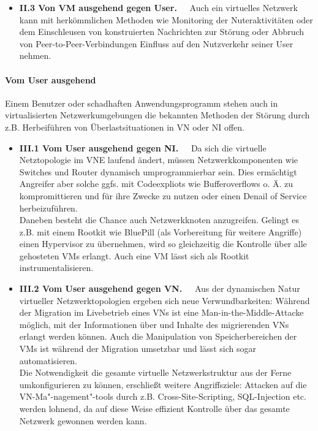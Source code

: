 \begin{itemize}
\item \textbf{II.3 Von VM ausgehend gegen User.~~}
Auch ein virtuelles Netzwerk kann mit herkömmlichen Methoden wie Monitoring der Nuteraktivitäten oder dem Einschleusen von konstruierten Nachrichten zur Störung oder Abbruch von Peer-to-Peer-Verbindungen Einfluss auf den Nutzverkehr seiner User nehmen.
\end{itemize}



\paragraph{Vom User ausgehend}
\label{parag:vonUser}
Einem Benutzer oder schadhaften Anwendungsprogramm stehen auch in virtualisierten Netzwerkumgebungen die bekannten Methoden der Störung durch z.B. Herbeiführen von Überlastsituationen in VN oder NI offen.

\begin{itemize}
	\item \textbf{III.1 Vom User ausgehend gegen NI.~~}
	Da sich die virtuelle Netztopologie im VNE laufend ändert, müssen Netzwerkkomponenten wie Switches und Router dynamisch umprogrammierbar sein. Dies ermächtigt Angreifer aber solche ggfs. mit Codeexpliots wie Bufferoverflows o. Ä. zu kompromittieren und für ihre Zwecke zu nutzen oder einen Denail of Service herbeizuführen.\\
	Daneben besteht die Chance auch Netzwerkknoten anzugreifen. Gelingt es z.B. mit einem Rootkit wie BluePill \cite{rutkowska2008bluepilling} (als Vorbereitung für weitere Angriffe) einen Hypervisor zu übernehmen, wird so gleichzeitig die Kontrolle über alle gehosteten VMs erlangt. Auch eine VM lässt sich als Rootkit instrumentalisieren. \cite{wu2010network}
	\item \textbf{III.2 Vom User ausgehend gegen VN.~~}
	Aus der dynamischen Natur virtueller Netzwerktopologien ergeben sich neue Verwundbarkeiten: Während der Migration im Livebetrieb eines VNs ist eine Man-in-the-Middle-Attacke möglich, mit der Informationen über und Inhalte des migrierenden VNs erlangt werden können. \cite{natarajansecurity} Auch die Manipulation von Speicherbereichen der VMs ist während der Migration umsetzbar und lässt sich sogar automatisieren. \cite{oberheide2008empirical}\\
	Die Notwendigkeit die gesamte virtuelle Netzwerkstruktur aus der Ferne umkonfigurieren zu können, erschließt weitere Angriffsziele: Attacken auf die VN-Ma"-nagement"-tools durch z.B. Cross-Site-Scripting, SQL-Injection etc. werden lohnend, da auf diese Weise effizient Kontrolle über das gesamte Netzwerk gewonnen werden kann.	
\end{itemize}



